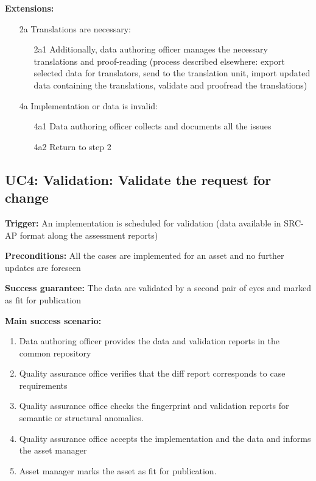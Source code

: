 	\textbf{Extensions:}
	\begin{enumerate}
		\item [2a] Translations are necessary:
		\begin{enumerate}
			\item [2a1] Additionally, data authoring officer manages the necessary translations and proof-reading (process described elsewhere: export selected data for translators, send to the translation unit,  import updated data containing the translations, validate and proofread the translations)			
		\end{enumerate}
		\item [4a] Implementation or data is invalid:
		\begin{enumerate}
			\item [4a1] Data authoring officer collects and documents all the issues 
			\item [4a2] Return to step 2			
		\end{enumerate}
	\end{enumerate}
	
	\subsection{UC4: Validation: Validate the request for change}
	\label{sec:uc4}
	
	\textbf{Trigger:} An implementation is scheduled for validation (data available in SRC-AP format along the assessment reports)
	
	\textbf{Preconditions:} All the cases are implemented for an asset and no further updates are foreseen
	
	\textbf{Success guarantee:} The data are validated by a second pair of eyes and marked as fit for publication
	
	\textbf{Main success scenario:} 
	
	\begin{enumerate}
		\item Data authoring officer provides the data and validation reports in the common repository 
		\item Quality assurance office verifies that the diff report corresponds to case requirements
		\item Quality assurance office checks the fingerprint and validation reports for semantic or structural anomalies. 
		\item Quality assurance office accepts the implementation and the data and informs the asset manager
		\item Asset manager marks the asset as fit for publication.
		
	\end{enumerate}
	

